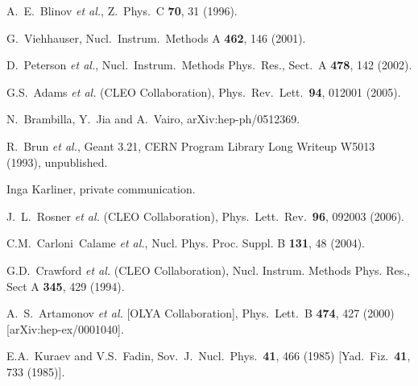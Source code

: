 \documentclass{cornell}
\begin{document}
\begin{thebibliography}{99}
A.~E.~Blinov {\it et al.},
  Z.\ Phys.\ C {\bf 70}, 31 (1996).

G.~Viehhauser, Nucl.\ Instrum.\ Methods A {\bf 462}, 146 (2001).

D.~Peterson {\it et al.}, Nucl.\ Instrum.\ Methods Phys.\ Res., Sect.\ A {\bf 478}, 142 (2002).

G.S.~Adams {\it et al.}  (CLEO Collaboration),
Phys.\ Rev.\ Lett.\  {\bf 94}, 012001 (2005).

N.~Brambilla, Y.~Jia and A.~Vairo,
  arXiv:hep-ph/0512369.

R.~Brun {\it et al.}, {\textsc Geant} 3.21, CERN Program Library Long
Writeup W5013 (1993), unpublished.

Inga Karliner, private communication.

J.~L.~Rosner {\it et al.} (CLEO Collaboration), Phys.\ Lett.\ Rev.\ {\bf 96}, 092003 (2006).

C.M.~Carloni~Calame {\sl et al.},
Nucl. Phys. Proc. Suppl. B {\bf 131}, 48 (2004).

G.D.~Crawford {\it et al.} (CLEO Collaboration),
Nucl. Instrum. Methods Phys. Res., Sect A {\bf 345}, 429 (1994).

A.~S.~Artamonov {\it et al.}  [OLYA Collaboration],
  Phys.\ Lett.\ B {\bf 474}, 427 (2000)
  [arXiv:hep-ex/0001040].

E.A.~Kuraev and V.S.~Fadin,
Sov.\ J.\ Nucl.\ Phys.\  {\bf 41}, 466 (1985)
[Yad.\ Fiz.\  {\bf 41}, 733 (1985)].


\end{thebibliography}
\end{document}
